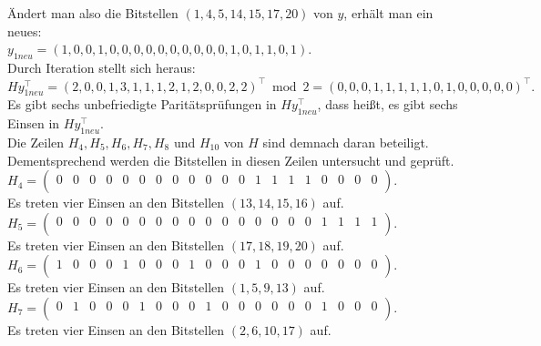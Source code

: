\begin{Beispiel}
    Ändert man also die Bitstellen $(1, 4, 5, 14, 15, 17, 20)$ von $y$, erhält man ein neues:\\
    $y_{1neu} = (1,0,0,1,0,0,0,0,0,0,0,0,0,0,1,0,1,1,0,1).$\\
    
    Durch Iteration stellt sich heraus:\\
    $Hy_{1neu}^\intercal= (2,0,0,1,3,1,1,1,2,1,2,0,0,2,2)^\intercal \bmod 2= (0,0,0,1,1,1,1,1,0,1,0,0,0,0,0)^\intercal.$\\
    
    Es gibt sechs unbefriedigte Paritätsprüfungen in $Hy_{1neu}^\intercal$,
    dass hei\ss{}t, es gibt sechs Einsen in $Hy_{1neu}^\intercal.$\\
    Die Zeilen $H_4, H_5, H_6, H_7, H_8$ und $H_{10}$ von $H$ sind demnach daran beteiligt.\\ 
    Dementsprechend werden die Bitstellen in diesen Zeilen untersucht und geprüft.\\
    
    $H_4= \left( \begin{array}{rrrrrrrrrrrrrrrrrrrr}
        0 & 0 & 0 & 0 & 0 & 0 & 0 & 0 & 0 & 0 & 0 & 0 & 1 & 1 & 1 & 1 & 0 & 0 & 0 & 0 \\
       \end{array}\right). 
    $\\
    Es treten vier Einsen an den Bitstellen $(13, 14, 15, 16)$ auf.\\
    
    $H_5= \left( \begin{array}{rrrrrrrrrrrrrrrrrrrr}
        0 & 0 & 0 & 0 & 0 & 0 & 0 & 0 & 0 & 0 & 0 & 0 & 0 & 0 & 0 & 0 & 1 & 1 & 1 & 1 \\
       \end{array}\right). 
    $\\
    Es treten vier Einsen an den Bitstellen $(17, 18, 19, 20)$ auf.\\
    
    $H_6= \left( \begin{array}{rrrrrrrrrrrrrrrrrrrr}
        1 & 0 & 0 & 0 & 1 & 0 & 0 & 0 & 1 & 0 & 0 & 0 & 1 & 0 & 0 & 0 & 0 & 0 & 0 & 0 \\
       \end{array}\right). 
    $\\
    Es treten vier Einsen an den Bitstellen $(1, 5, 9, 13)$ auf.\\
    
    $H_7= \left( \begin{array}{rrrrrrrrrrrrrrrrrrrr}
        0 & 1 & 0 & 0 & 0 & 1 & 0 & 0 & 0 & 1 & 0 & 0 & 0 & 0 & 0 & 0 & 1 & 0 & 0 & 0 \\
       \end{array}\right). 
    $\\
    Es treten vier Einsen an den Bitstellen $(2, 6, 10, 17)$ auf.\\
    

\end{Beispiel}
